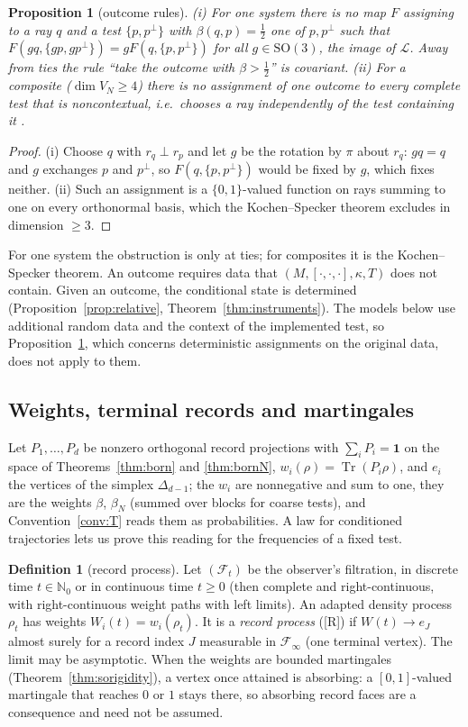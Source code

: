 \documentclass[aps,pra,onecolumn,superscriptaddress,nofootinbib,10pt]{revtex4-2}
\newtheorem{proposition}[theorem]{Proposition}
\theoremstyle{definition}
\newtheorem{definition}[theorem]{Definition}
\theoremstyle{remark}
\newcommand{\cL}{\mathcal{L}}
\newcommand{\tr}{\operatorname{Tr}}
\newcommand{\hp}[3]{[#1,#2,#3]}
\newcommand{\SO}{\mathrm{SO}}
\begin{document}
\begin{proposition}[outcome rules]\label{prop:nooutcome}
(i) For one system there is no map $F$ assigning to a ray $q$ and a test $\{p,p^\perp\}$ with
$\beta(q,p)=\tfrac12$ one of $p,p^\perp$ such that $F(gq,\{gp,gp^\perp\})=gF(q,\{p,p^\perp\})$ for all
$g\in\SO(3)$, the image of $\cL$.  Away from ties the rule ``take the outcome with $\beta>\frac12$'' is
covariant.
(ii) For a composite ($\dim V_N\ge4$) there is no assignment of one outcome to every
complete test that is noncontextual, i.e.\ chooses a ray independently of the test containing it
\cite{KS67,Bell66}.
\end{proposition}
\begin{proof}
(i) Choose $q$ with $r_q\perp r_p$ and let $g$ be the rotation by $\pi$ about $r_q$: $gq=q$ and $g$ exchanges
$p$ and $p^\perp$, so $F(q,\{p,p^\perp\})$ would be fixed by $g$, which fixes neither.  (ii) Such an assignment
is a $\{0,1\}$-valued function on rays summing to one on every orthonormal basis, which the
Kochen--Specker theorem excludes in dimension $\ge3$.
\end{proof}
For one system the obstruction is only at ties; for composites it is the Kochen--Specker theorem.  An
outcome requires data that $(M,\hp{\cdot}{\cdot}{\cdot},\kappa,T)$ does not contain.  Given an outcome, the conditional
state is determined (Proposition~\ref{prop:relative}, Theorem~\ref{thm:instruments}).  The models below use additional
random data and the context of the implemented test, so Proposition~\ref{prop:nooutcome}, which concerns
deterministic assignments on the original data, does not apply to them.

\subsection{Weights, terminal records and martingales}\label{sec:sorecords}
Let $P_1,\dots,P_d$ be nonzero orthogonal record projections with $\sum_iP_i=\mathbf1$ on the space of Theorems~\ref{thm:born} and
\ref{thm:bornN}, $w_i(\rho)=\tr(P_i\rho)$, and $e_i$ the vertices of the simplex $\Delta_{d-1}$; the $w_i$ are nonnegative and sum to
one, they are the weights $\beta$, $\beta_N$ (summed over blocks for coarse tests), and Convention~\ref{conv:T} reads
them as probabilities.  A law for conditioned trajectories lets us prove this reading for the
frequencies of a fixed test.

\begin{definition}[record process]\label{def:soprocess}
Let $(\mathcal F_t)$ be the observer's filtration, in discrete time $t\in\mathbb N_0$ or in continuous time $t\ge0$ (then complete and
right-continuous, with right-continuous weight paths with left limits).  An adapted density process $\rho_t$ has
weights $W_i(t)=w_i(\rho_t)$.  It is a \emph{record process} ([R]) if $W(t)\to e_J$ almost surely for a record index $J$
measurable in $\mathcal F_\infty$ (one terminal vertex).  The limit may be asymptotic.  When the weights are
bounded martingales (Theorem~\ref{thm:sorigidity}), a vertex once attained is absorbing: a $[0,1]$-valued martingale that
reaches $0$ or $1$ stays there, so absorbing record faces are a consequence and need not be assumed.
\end{definition}
\end{document}
